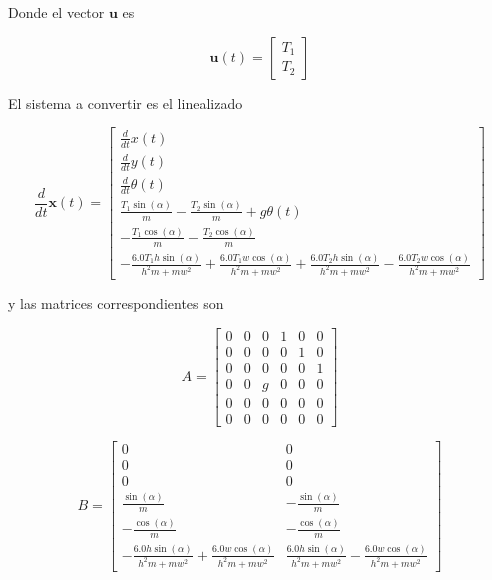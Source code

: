 \documentclass[titlepage, letterpaper]{article}
\begin{document}
Donde el vector $\pmb{u}$ es

\begin{equation*}
	\pmb{u}(t) = \left[\begin{matrix}T_{1}\\T_{2}\end{matrix}\right]
\end{equation*}

El sistema a convertir es el linealizado

\begin{equation*}\frac{d}{d t} \pmb{x}{\left(t \right)} = \left[\begin{matrix}\frac{d}{d t} x{\left(t \right)}\\\frac{d}{d t} y{\left(t \right)}\\\frac{d}{d t} \theta{\left(t \right)}\\\frac{T_{1} \sin{\left(\alpha \right)}}{m} - \frac{T_{2} \sin{\left(\alpha \right)}}{m} + g \theta{\left(t \right)}\\- \frac{T_{1} \cos{\left(\alpha \right)}}{m} - \frac{T_{2} \cos{\left(\alpha \right)}}{m}\\- \frac{6.0 T_{1} h \sin{\left(\alpha \right)}}{h^{2} m + m w^{2}} + \frac{6.0 T_{1} w \cos{\left(\alpha \right)}}{h^{2} m + m w^{2}} + \frac{6.0 T_{2} h \sin{\left(\alpha \right)}}{h^{2} m + m w^{2}} - \frac{6.0 T_{2} w \cos{\left(\alpha \right)}}{h^{2} m + m w^{2}}\end{matrix}\right]\end{equation*}

y las matrices correspondientes son

\begin{equation*}
	A = \left[\begin{matrix}0 & 0 & 0 & 1 & 0 & 0\\0 & 0 & 0 & 0 & 1 & 0\\0 & 0 & 0 & 0 & 0 & 1\\0 & 0 & g & 0 & 0 & 0\\0 & 0 & 0 & 0 & 0 & 0\\0 & 0 & 0 & 0 & 0 & 0\end{matrix}\right]
\end{equation*}

\begin{equation*}
	B = \left[\begin{matrix}0 & 0\\0 & 0\\0 & 0\\\frac{\sin{\left(\alpha \right)}}{m} & - \frac{\sin{\left(\alpha \right)}}{m}\\- \frac{\cos{\left(\alpha \right)}}{m} & - \frac{\cos{\left(\alpha \right)}}{m}\\- \frac{6.0 h \sin{\left(\alpha \right)}}{h^{2} m + m w^{2}} + \frac{6.0 w \cos{\left(\alpha \right)}}{h^{2} m + m w^{2}} & \frac{6.0 h \sin{\left(\alpha \right)}}{h^{2} m + m w^{2}} - \frac{6.0 w \cos{\left(\alpha \right)}}{h^{2} m + m w^{2}}\end{matrix}\right]
\end{equation*}
\end{document}
